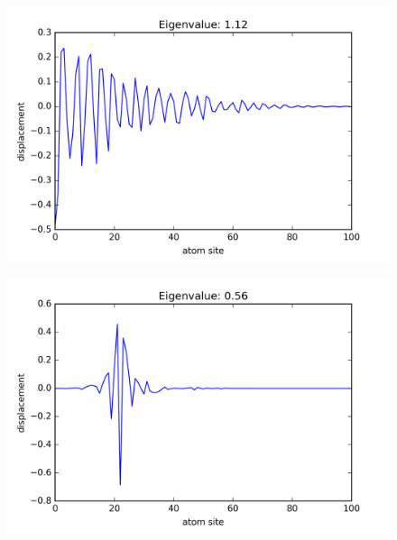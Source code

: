 \begin{figure}[!htbh]
\centering
\begin{minipage}{.45\textwidth}
  \centering
  \includegraphics[width=1.1\linewidth]{Harmonic_mass_ratio/normal_Prob_0_5N_103m_2_0p_51th.png}
  \label{fig:mass ratio 2.0 51st}
\end{minipage}\qquad
\begin{minipage}{.45\textwidth}
  \centering
  \includegraphics[width=1.1\linewidth]{Harmonic_mass_ratio/normal_Prob_0_5N_103m_10_0p_51th.png}
  \label{fig:mass ratio 10.0 51st}
\end{minipage}
\end{figure}



